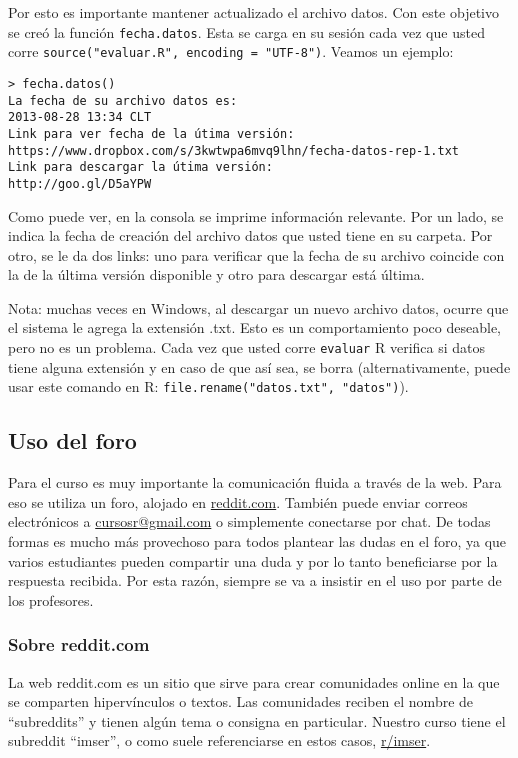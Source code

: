 \documentclass[]{article}
\begin{document}
Por esto es importante mantener actualizado el archivo datos. Con este
objetivo se creó la función \texttt{fecha.datos}. Esta se carga en su
sesión cada vez que usted corre
\texttt{source("evaluar.R", encoding = "UTF-8")}. Veamos un ejemplo:

\begin{verbatim}
> fecha.datos()
La fecha de su archivo datos es:
2013-08-28 13:34 CLT 
Link para ver fecha de la útima versión:
https://www.dropbox.com/s/3kwtwpa6mvq9lhn/fecha-datos-rep-1.txt 
Link para descargar la útima versión:
http://goo.gl/D5aYPW 
\end{verbatim}
Como puede ver, en la consola se imprime información relevante. Por un
lado, se indica la fecha de creación del archivo datos que usted tiene
en su carpeta. Por otro, se le da dos links: uno para verificar que la
fecha de su archivo coincide con la de la última versión disponible y
otro para descargar está última.

Nota: muchas veces en Windows, al descargar un nuevo archivo datos,
ocurre que el sistema le agrega la extensión .txt. Esto es un
comportamiento poco deseable, pero no es un problema. Cada vez que usted
corre \texttt{evaluar} R verifica si datos tiene alguna extensión y en
caso de que así sea, se borra (alternativamente, puede usar este comando
en R: \texttt{file.rename("datos.txt", "datos")}).

\subsection{Uso del foro}

Para el curso es muy importante la comunicación fluida a través de la
web. Para eso se utiliza un foro, alojado en
\href{reddit.com/r/imser}{reddit.com}. También puede enviar correos
electrónicos a \href{mailto:cursosr@gmail.com}{cursosr@gmail.com} o
simplemente conectarse por chat. De todas formas es mucho más provechoso
para todos plantear las dudas en el foro, ya que varios estudiantes
pueden compartir una duda y por lo tanto beneficiarse por la respuesta
recibida. Por esta razón, siempre se va a insistir en el uso por parte
de los profesores.

\subsubsection{Sobre reddit.com}

La web reddit.com es un sitio que sirve para crear comunidades online en
la que se comparten hipervínculos o textos. Las comunidades reciben el
nombre de ``subreddits'' y tienen algún tema o consigna en particular.
Nuestro curso tiene el subreddit ``imser'', o como suele referenciarse
en estos casos, \href{reddit.com/r/imser}{r/imser}.
\end{document}
